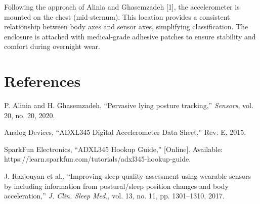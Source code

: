 \documentclass[conference]{IEEEtran}
\begin{document}
Following the approach of Alinia and Ghasemzadeh [1], the accelerometer is mounted on 
the chest (mid-sternum). This location provides a consistent relationship between body 
axes and sensor axes, simplifying classification. The enclosure is attached with 
medical-grade adhesive patches to ensure stability and comfort during overnight wear.

\section{References}

\begin{enumerate}[label={[\arabic*]},leftmargin=*]
    \item P. Alinia and H. Ghasemzadeh, ``Pervasive lying posture tracking,'' \textit{Sensors}, vol. 20, no. 20, 2020.
    \item Analog Devices, ``ADXL345 Digital Accelerometer Data Sheet,'' Rev. E, 2015.
    \item SparkFun Electronics, ``ADXL345 Hookup Guide,'' [Online]. Available: https://learn.sparkfun.com/tutorials/adxl345-hookup-guide.
    \item J. Razjouyan et al., ``Improving sleep quality assessment using wearable sensors by including information from postural/sleep position changes and body acceleration,'' \textit{J. Clin. Sleep Med.}, vol. 13, no. 11, pp. 1301--1310, 2017.
\end{enumerate}
\end{document}
